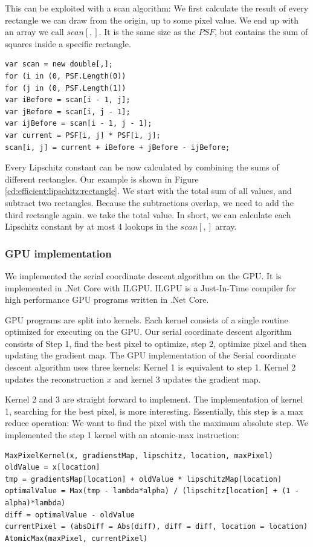 This can be exploited with a scan algorithm: We first calculate the result of every rectangle we can draw from the origin, up to some pixel value. We end up with an array we call $scan[,]$. It is the same size as the $PSF$, but contains the sum of squares inside a specific rectangle.

\begin{lstlisting}
var scan = new double[,];
for (i in (0, PSF.Length(0))
for (j in (0, PSF.Length(1))
var iBefore = scan[i - 1, j];
var jBefore = scan[i, j - 1];
var ijBefore = scan[i - 1, j - 1];
var current = PSF[i, j] * PSF[i, j];
scan[i, j] = current + iBefore + jBefore - ijBefore;
\end{lstlisting}

Every Lipschitz constant can be now calculated by combining the sums of different rectangles. Our example is shown in Figure \ref{cd:efficient:lipschitz:rectangle}. We start with the total sum of all values, and subtract two rectangles. Because the subtractions overlap, we need to add the third rectangle again. we take the total value. In short, we can calculate each Lipschitz constant by at most 4 lookups in the $scan[,]$ array.


\subsubsection{GPU implementation}
We implemented the serial coordinate descent algorithm on the GPU. It is implemented in .Net Core with ILGPU\cite{ilgpu}. ILGPU is a Just-In-Time compiler for high performance GPU programs written in .Net Core.

GPU programs are split into kernels. Each kernel consists of a single routine optimized for executing on the GPU. Our serial coordinate descent algorithm consists of Step 1, find the best pixel to optimize, step 2, optimize pixel and then updating the gradient map. The GPU implementation of the Serial coordinate descent algorithm uses three kernels: Kernel 1 is equivalent to step 1. Kernel 2 updates the reconstruction $x$ and kernel 3 updates the gradient map.

Kernel 2 and 3 are straight forward to implement. The implementation of kernel 1, searching for the best pixel, is more interesting. Essentially, this step is a max reduce operation: We want to find the pixel with the maximum absolute step. We implemented the step 1 kernel with an atomic-max instruction:
\begin{lstlisting}
MaxPixelKernel(x, gradienstMap, lipschitz, location, maxPixel)
oldValue = x[location]
tmp = gradientsMap[location] + oldValue * lipschitzMap[location]
optimalValue = Max(tmp - lambda*alpha) / (lipschitz[location] + (1 - alpha)*lambda)
diff = optimalValue - oldValue
currentPixel = (absDiff = Abs(diff), diff = diff, location = location)
AtomicMax(maxPixel, currentPixel)
\end{lstlisting}

